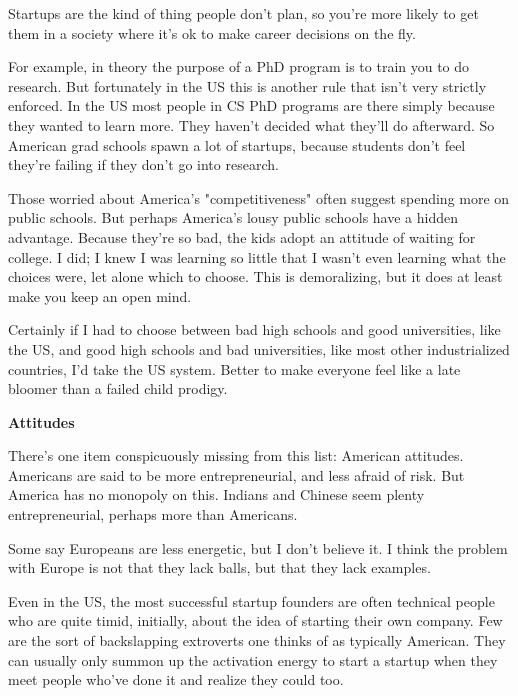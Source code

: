 Startups are the kind of thing people don't
                  plan, so you're more likely to get them in a society where
                  it's ok to make career decisions on the fly.

For
                  example, in theory the purpose of a PhD program is to train
                  you to do research. But fortunately in the US this is another
                  rule that isn't very strictly enforced. In the US most people
                  in CS PhD programs are there simply because they wanted to
                  learn more. They haven't decided what they'll do afterward. So
                  American grad schools spawn a lot of startups, because
                  students don't feel they're failing if they don't go into
                  research.

Those worried about America's
                  "competitiveness" often suggest spending more on public
                  schools. But perhaps America's lousy public schools have a
                  hidden advantage. Because they're so bad, the kids adopt an
                  attitude of waiting for college. I did; I knew I was learning
                  so little that I wasn't even learning what the choices were,
                  let alone which to choose. This is demoralizing, but it does
                  at least make you keep an open mind.

Certainly if I
                  had to choose between bad high schools and good universities,
                  like the US, and good high schools and bad universities, like
                  most other industrialized countries, I'd take the US system.
                  Better to make everyone feel like a late bloomer than a failed
                  child prodigy.

\textbf{Attitudes}

There's
                  one item conspicuously missing from this list: American
                  attitudes. Americans are said to be more entrepreneurial, and
                  less afraid of risk. But America has no monopoly on this.
                  Indians and Chinese seem plenty entrepreneurial, perhaps more
                  than Americans.

Some say Europeans are less
                  energetic, but I don't believe it. I think the problem with
                  Europe is not that they lack balls, but that they lack
                  examples.

Even in the US, the most successful
                  startup founders are often technical people who are quite
                  timid, initially, about the idea of starting their own
                  company. Few are the sort of backslapping extroverts one
                  thinks of as typically American. They can usually only summon
                  up the activation energy to start a startup when they meet
                  people who've done it and realize they could too.

